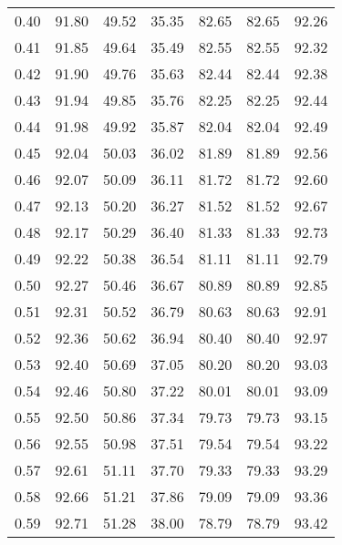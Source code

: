 \begin{tabular}{|c|c|c|c|c|c|c|}
      0.40 &     91.80 &     49.52 &      35.35 &   82.65 &      82.65 &         92.26 \\
      0.41 &     91.85 &     49.64 &      35.49 &   82.55 &      82.55 &         92.32 \\
      0.42 &     91.90 &     49.76 &      35.63 &   82.44 &      82.44 &         92.38 \\
      0.43 &     91.94 &     49.85 &      35.76 &   82.25 &      82.25 &         92.44 \\
      0.44 &     91.98 &     49.92 &      35.87 &   82.04 &      82.04 &         92.49 \\
      0.45 &     92.04 &     50.03 &      36.02 &   81.89 &      81.89 &         92.56 \\
      0.46 &     92.07 &     50.09 &      36.11 &   81.72 &      81.72 &         92.60 \\
      0.47 &     92.13 &     50.20 &      36.27 &   81.52 &      81.52 &         92.67 \\
      0.48 &     92.17 &     50.29 &      36.40 &   81.33 &      81.33 &         92.73 \\
      0.49 &     92.22 &     50.38 &      36.54 &   81.11 &      81.11 &         92.79 \\
      0.50 &     92.27 &     50.46 &      36.67 &   80.89 &      80.89 &         92.85 \\
      0.51 &     92.31 &     50.52 &      36.79 &   80.63 &      80.63 &         92.91 \\
      0.52 &     92.36 &     50.62 &      36.94 &   80.40 &      80.40 &         92.97 \\
      0.53 &     92.40 &     50.69 &      37.05 &   80.20 &      80.20 &         93.03 \\
      0.54 &     92.46 &     50.80 &      37.22 &   80.01 &      80.01 &         93.09 \\
      0.55 &     92.50 &     50.86 &      37.34 &   79.73 &      79.73 &         93.15 \\
      0.56 &     92.55 &     50.98 &      37.51 &   79.54 &      79.54 &         93.22 \\
      0.57 &     92.61 &     51.11 &      37.70 &   79.33 &      79.33 &         93.29 \\
      0.58 &     92.66 &     51.21 &      37.86 &   79.09 &      79.09 &         93.36 \\
      0.59 &     92.71 &     51.28 &      38.00 &   78.79 &      78.79 &         93.42 \\

\end{tabular}
